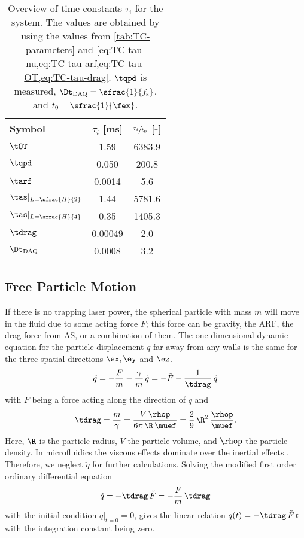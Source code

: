 \begin{table}
  \centering
  \begin{tabular}{l S[table-format=7.5]S[table-format=7.1]}
    \toprule
    \toprule
    {\bfseries Symbol} & {\bfseries $\tau_{i}$ [\si{\ms}]} & {\bfseries 
    $\sfrac{\tau_{i}}{t_{0}}$ [-]}  \\
    \midrule
    $\tOT$ & 1.59 & 6383.9 \\
    $\tqpd$ & 0.050 & 200.8 \\
    $\tarf$ & 0.0014 & 5.6 \\
    $\tas\vert_{L=\sfrac{H}{2}}$ & 1.44 & 5781.6\\
    $\tas\vert_{L=\sfrac{H}{4}}$ & 0.35 & 1405.3\\
    $\tdrag$ & 0.00049 & 2.0 \\
    \midrule
    $\Dt_{\text{DAQ}}$ & 0.0008 & 3.2 \\
    \bottomrule
    \bottomrule
    
  \end{tabular}
  \caption{Overview of time constants $\tau_{\text{i}}$ for the system. The 
    values are obtained by using the values from \cref{tab:TC-parameters} and 
\cref{eq:TC-tau-nu,eq:TC-tau-arf,eq:TC-tau-OT,eq:TC-tau-drag}. $\tqpd$ is 
measured, $\Dt_{\text{DAQ}} = \sfrac{1}{f_{\text{s}}}$, and 
$t_{0}=\sfrac{1}{\fex}$.}\label{tab:TC-time-constants}
\end{table}

\subsection{Free Particle Motion}

If there is no trapping laser power, the spherical particle with mass $m$ will 
move in the fluid due to some acting force $F$; this force can be gravity, the 
ARF, the drag force from AS, or a combination of them. The one dimensional 
dynamic equation for the particle displacement $q$ far away from any walls is 
the same for the three spatial directions $\ex, \ey$ and $\ez$.
\begin{equation}
  \ddot{q} = - \frac{F}{m} - \frac{\gamma}{m}\,\dot{q} =
  - \tilde{F} - \frac{1}{\tdrag}\,\dot{q}
  \label{eq:TC-free-fall}
\end{equation}
with $F$ being a force acting along the direction of $q$ and
\begin{equation}
  \tdrag = \frac{m}{\gamma} = \frac{V\,\rhop}{6\pi\,\R\,\muef}
  = \frac{2}{9}\,\R^{2}\,\frac{\rhop}{\muef}.
  \label{eq:TC-tau-drag}
\end{equation}
Here, $\R$ is the particle radius, $V$ the particle volume, and $\rhop$ the 
particle density. In microfluidics the viscous effects dominate over the 
inertial effects \cite{Bruus2015}. Therefore, we neglect $\ddot{q}$ for further 
calculations. Solving the modified first order ordinary differential equation
\begin{equation}
    \dot{q}= - \tdrag\,\tilde{F} = -\frac{F}{m}\,\tdrag
  \label{eq:TC-mod-free-fall}
\end{equation}
with the initial condition $q\vert_{t=0} = 0$, gives the linear relation $q(t) 
= - \tdrag\,\tilde{F}\,t$ with the integration constant being zero.

